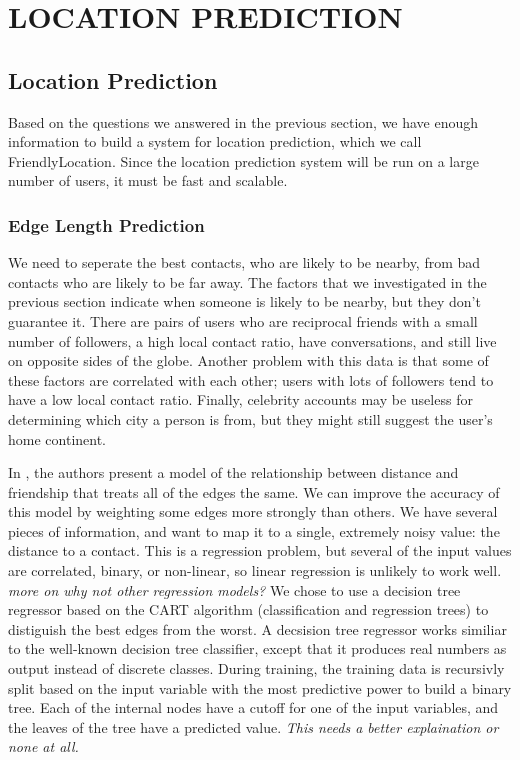 \ifdefined\THESIS
    \chapter{\uppercase{Location Prediction}}
\else
    \section{Location Prediction}
\fi

Based on the questions we answered in the previous section, we have enough
information to build a system for location prediction, which we call
FriendlyLocation.
Since the location prediction system will be run on a large number of users,
it must be fast and scalable.

\subsection{Edge Length Prediction}

We need to seperate the best contacts, who are likely to be nearby, from
bad contacts who are likely to be far away.
The factors that we investigated in the previous section indicate when someone
is likely to be nearby, but they don't guarantee it.
There are pairs of users who are reciprocal friends with a small number of
followers, a high local contact ratio, have conversations, and still live on
opposite sides of the globe.
Another problem with this data is that some of these factors are correlated
with each other; users with lots of followers tend to have a low local contact
ratio.
Finally, celebrity accounts may be useless for determining which city a person
is from, but they might still suggest the user's home continent.

In \cite{backstrom2010find}, the authors present a model of the relationship
between distance and friendship that treats all of the edges the same.
%
We can improve the accuracy of this model by weighting some edges more strongly
than others.
%
We have several pieces of information, and want to map it to a single, extremely
noisy value: the distance to a contact.
%
This is a regression problem, but several of the input values are correlated,
binary, or non-linear, so linear regression is unlikely to work well.
%
\emph{more on why not other regression models?}
%
We chose to use a decision tree regressor based on the CART algorithm
(classification and regression trees) to distiguish the best edges from the
worst.
A decsision tree regressor works similiar to the well-known decision tree
classifier, except that it produces real numbers as output instead of discrete
classes.
During training, the training data is recursivly split based on the input
variable with the most predictive power to build a binary tree.
Each of the internal nodes have a cutoff for one of the input variables, and
the leaves of the tree have a predicted value.
\emph{This needs a better explaination or none at all.}

